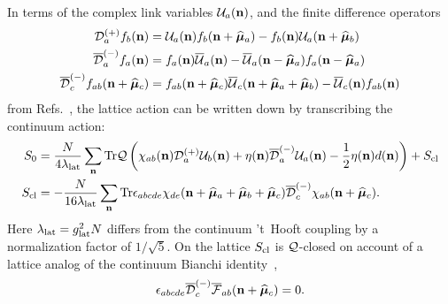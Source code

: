 In terms of the complex link variables $\mathcal U_a(\mathbf{n})$, and the finite difference operators
\begin{align}
  \mathcal D^{(+)}_a f_b(\mathbf{n}) & = \mathcal U_a(\mathbf{n})f_b(\mathbf{n} + \widehat{\boldsymbol{\mu}}_a) - f_b(\mathbf{n})\mathcal U_a(\mathbf{n}+ \widehat{\boldsymbol{\mu}}_b)                                       \cr
  {\overline{\cal D}}^{(-)}_a f_a(\mathbf{n}) & = f_a(\mathbf{n}){\overline{\cal U}}_a(\mathbf{n}) - {\overline{\cal U}}_a(\mathbf{n} - \widehat{\boldsymbol{\mu}}_a)f_a(\mathbf{n} - \widehat{\boldsymbol{\mu}}_a)                                   \\
  {\overline{\cal D}}_c^{(-)} f_{ab}(\mathbf{n} + \widehat{\boldsymbol{\mu}}_c) & = f_{ab}(\mathbf{n} + \widehat{\boldsymbol{\mu}}_c) {\overline{\cal U}}_c(\mathbf{n} + \widehat{\boldsymbol{\mu}}_a + \widehat{\boldsymbol{\mu}}_b) - {\overline{\cal U}}_c(\mathbf{n})f_{ab}(\mathbf{n}) \nonumber
\end{align}
from Refs.~\cite{Catterall:2007kn, Damgaard:2008pa}, the lattice action can be written down by transcribing the continuum action:
\begin{align}
  \label{SlatQ}
  S_0 & = \frac{N}{4\lambda_{\rm lat}} \sum_{\mathbf{n}} \mathrm{Tr}  \mathcal{Q} \left(\chi_{ab}(\mathbf{n})\mathcal D_a^{(+)}\mathcal U_b(\mathbf{n}) + \eta(\mathbf{n}) {\overline{\cal D}}_a^{(-)}\mathcal U_a(\mathbf{n}) - \frac{1}{2}\eta(\mathbf{n}) d(\mathbf{n}) \right) + S_{\rm cl} \\
  S_{\rm cl} & = -\frac{N}{16\lambda_{\rm lat}} \sum_{\mathbf{n}} \mathrm{Tr} \epsilon_{abcde} \chi_{de}(\mathbf{n} + \widehat{\boldsymbol{\mu}}_a + \widehat{\boldsymbol{\mu}}_b + \widehat{\boldsymbol{\mu}}_c) {\overline{\cal D}}^{(-)}_{c} \chi_{ab}(\mathbf{n} + \widehat{\boldsymbol{\mu}}_c).
\end{align}
Here $\lambda_{\rm lat} = g_{\rm lat}^2 N$ differs from the continuum 't~Hooft coupling by a 
normalization factor of $1 / \sqrt{5}$. 
On the lattice $S_{\rm cl}$ is $\mathcal Q$-closed on account of a lattice analog of the continuum 
Bianchi identity~\cite{Catterall:2007kn},
\begin{equation}
  \epsilon_{abcde} {\overline{\cal D}}^{(-)}_c {\overline{\cal F}}_{ab}(\mathbf{n} + \widehat{\boldsymbol{\mu}}_c) = 0.
\end{equation}

